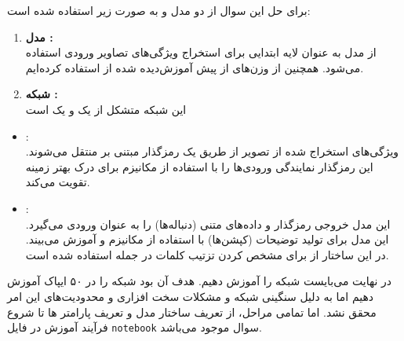 \begin{qsolve}
برای حل این سوال از دو مدل  و  به صورت زیر استفاده شده است:

	\begin{enumerate}
		\item \textbf{مدل :}\\
از مدل  به عنوان لایه ابتدایی برای استخراج ویژگی‌های تصاویر ورودی استفاده می‌شود. همچنین از وزن‌های از پیش آموزش‌دیده شده از  استفاده کرده‌ایم.


		\item \textbf{شبکه :}\\
		این شبکه متشکل از یک  و یک  است
	\end{enumerate}
\end{qsolve}



\begin{qsolve}
	\begin{itemize}
		\item {}:\\
		ویژگی‌های استخراج شده از تصویر از طریق یک رمزگذار مبتنی بر  منتقل می‌شوند. این رمزگذار نمایندگی ورودی‌ها را با استفاده از مکانیزم‌  برای درک بهتر زمینه تقویت می‌کند.
		
		\item {}:\\
		این مدل خروجی رمزگذار و داده‌های متنی (دنباله‌ها) را به عنوان ورودی می‌گیرد. این مدل برای تولید توضیحات (کپشن‌ها) با استفاده از مکانیزم‌  و  آموزش می‌بیند. در این ساختار از  برای مشخص کردن تزتیب کلمات در جمله استفاده شده است.
	\end{itemize}
	
	در نهایت می‌بایست شبکه را آموزش دهیم. هدف آن بود شبکه را در ۵۰ ایپاک آموزش دهیم اما به دلیل سنگینی شبکه و مشکلات سخت افزاری و محدودیت‌های  این امر محقق نشد. اما تمامی مراحل، از تعریف ساختار مدل و تعریف پارامتر ها تا شروع فرآیند آموزش در فایل \texttt{notebook} سوال موجود می‌باشد.
\end{qsolve}
